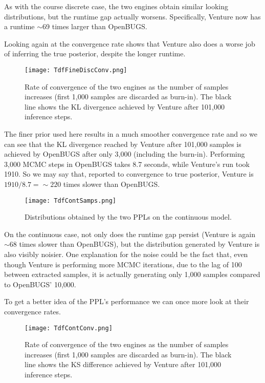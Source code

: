 As with the course discrete case, the two engines obtain similar looking distributions, but the runtime gap actually worsens. Specifically, Venture now has a runtime $\sim$69 times larger than OpenBUGS.

Looking again at the convergence rate shows that Venture also does a worse job of inferring the true posterior, despite the longer runtime.

\begin{figure}[H]
    \centering
    \texttt{[image: TdfFineDiscConv.png]}
    \caption{Rate of convergence of the two engines as the number of samples increases (first 1,000 samples are discarded as burn-in). The black line shows the KL divergence achieved by Venture after 101,000 inference steps.}
    \label{fig:tdfFineDiscConv}
\end{figure}

The finer prior used here results in a much smoother convergence rate and so we can see that the KL divergence reached by Venture after 101,000 samples is achieved by OpenBUGS after only 3,000 (including the burn-in). Performing 3,000 MCMC steps in OpenBUGS takes 8.7 seconds, while Venture's run took 1910. So we may say that, reported to convergence to true posterior, Venture is $1910/8.7 = \sim 220$ times slower than OpenBUGS.

\begin{figure}[H]
    \centering
    \texttt{[image: TdfContSamps.png]}
    \caption{Distributions obtained by the two PPLs on the continuous model.}
    \label{fig:tdfContSamp}
\end{figure}

On the continuous case, not only does the runtime gap persist (Venture is again $\sim$68 times slower than OpenBUGS), but the distribution generated by Venture is also visibly noisier. One explanation for the noise could be the fact that, even though Venture is performing more MCMC iterations, due to the lag of 100 between extracted samples, it is actually generating only 1,000 samples compared to OpenBUGS' 10,000. 

To get a better idea of the PPL's performance we can once more look at their convergence rates.

\begin{figure}[H]
    \centering
    \texttt{[image: TdfContConv.png]}
    \caption{Rate of convergence of the two engines as the number of samples increases (first 1,000 samples are discarded as burn-in). The black line shows the KS difference achieved by Venture after 101,000 inference steps.}
    \label{fig:tdfFineDiscConv}
\end{figure}

